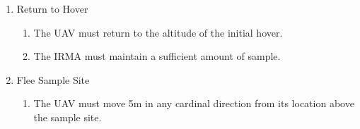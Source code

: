 \begin{enumerate}[noitemsep, label=\arabic*.]
\begin{enumerate}[noitemsep, label=4.\arabic*.]
\begin{enumerate}[noitemsep, label=4.1.\arabic*.]
		\end{enumerate}
		\item Return to Hover
		\begin{enumerate}[noitemsep, label=4.2.\arabic*.]
			\item The UAV must return to the altitude of the initial hover.
			\item The IRMA must maintain a sufficient amount of sample.
		\end{enumerate}
		\item Flee Sample Site
		\begin{enumerate}[noitemsep, label=4.3.\arabic*.]
			\item The UAV must move 5m in any cardinal direction from its location above the sample site.
		\end{enumerate}
	\end{enumerate}
\end{enumerate}
